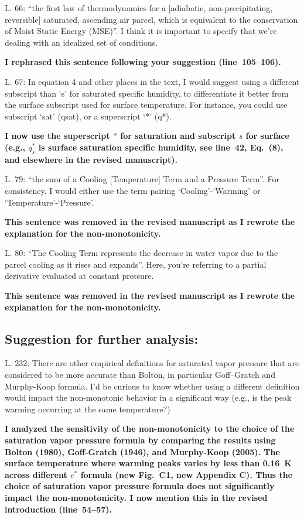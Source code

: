 \documentclass{article}
\begin{document}
\par
L. 66: ``the first law of thermodynamics for a [adiabatic, non-precipitating, reversible] saturated, ascending air parcel, which is equivalent to the conservation of Moist Static Energy (MSE)''. I think it is important to specify that we're dealing with an idealized set of conditions.
\par
\textbf{I rephrased this sentence following your suggestion (line~105--106).}
\par
L. 67: In equation 4 and other places in the text, I would suggest using a different subscript than `s' for saturated specific humidity, to differentiate it better from the surface subscript used for surface temperature. For instance, you could use subscript `sat' (qsat), or a superscript `*' (q*).
\par
\textbf{I now use the superscript $*$ for saturation and subscript $s$ for surface (e.g., $q_s^*$ is surface saturation specific humidity, see line~42, Eq.~(8), and elsewhere in the revised manuscript).}
\par
L. 79: ``the sum of a Cooling [Temperature] Term and a Pressure Term''. For consistency, I would either use the term pairing `Cooling'-`Warming' or `Temperature'-`Pressure'.
\par
\textbf{This sentence was removed in the revised manuscript as I rewrote the explanation for the non-monotonicity.}
\par
L. 80: ``The Cooling Term represents the decrease in water vapor due to the parcel cooling as it rises and expands''. Here, you're referring to a partial derivative evaluated at constant pressure.
\par
\textbf{This sentence was removed in the revised manuscript as I rewrote the explanation for the non-monotonicity.}
\par
\subsection{Suggestion for further analysis:}
\par
L. 232: There are other empirical definitions for saturated vapor pressure that are considered to be more accurate than Bolton, in particular Goff–Gratch and Murphy-Koop formula. I'd be curious to know whether using a different definition would impact the non-monotonic behavior in a significant way (e.g., is the peak warming occurring at the same temperature?)
\par
\textbf{I analyzed the sensitivity of the non-monotonicity to the choice of the saturation vapor pressure formula by comparing the results using Bolton (1980), Goff-Gratch (1946), and Murphy-Koop (2005). The surface temperature where warming peaks varies by less than 0.16~K across different $e^*$ formula (new Fig.~C1, new Appendix C). Thus the choice of saturation vapor pressure formula does not significantly impact the non-monotonicity. I now mention this in the revised introduction (line~54--57).}
\newpage
\end{document}

